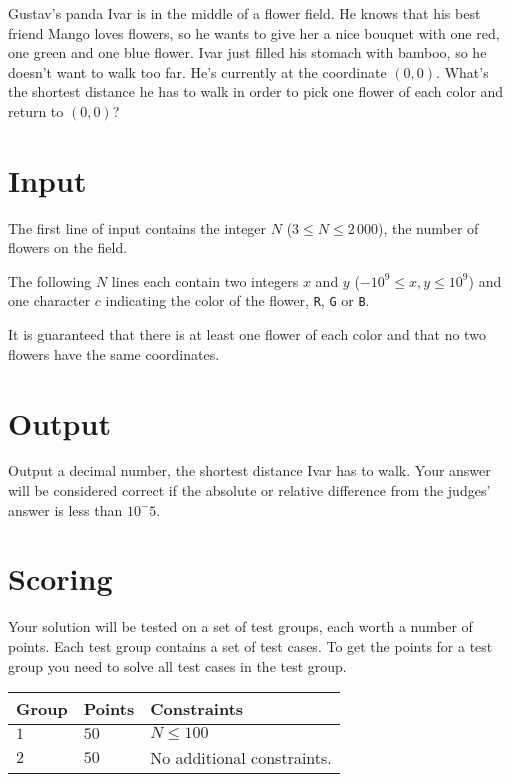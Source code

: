 \noindent

Gustav's panda Ivar is in the middle of a flower field.
He knows that his best friend Mango loves flowers, so he wants to give her a nice bouquet with one red, one green and one blue flower.
Ivar just filled his stomach with bamboo, so he doesn't want to walk too far.
He's currently at the coordinate $(0,0)$. What's the shortest distance he has to walk in order to pick one flower of each color and return to $(0,0)$?

\section*{Input}
The first line of input contains the integer $N$ ($3 \leq N \leq 2\,000$), the number of flowers on the field.

The following $N$ lines each contain two integers $x$ and $y$ ($-10^9 \leq x,y \leq 10^9$) and one character $c$ indicating the color
of the flower, \texttt{R}, \texttt{G} or \texttt{B}.

It is guaranteed that there is at least one flower of each color and that no two flowers have the same coordinates.

\section*{Output}
Output a decimal number, the shortest distance Ivar has to walk.
Your answer will be considered correct if the absolute or relative difference from the judges' answer is less than $10^-5$.

\section*{Scoring}
Your solution will be tested on a set of test groups, each worth a number of points. Each test group contains
a set of test cases. To get the points for a test group you need to solve all test cases in the test group.

\noindent
\begin{tabular}{| l | l | p{12cm} |}
  \hline
  \textbf{Group} & \textbf{Points} & \textbf{Constraints} \\ \hline
  $1$    & $50$       & $N \leq 100$ \\ \hline
  $2$    & $50$       & No additional constraints. \\ \hline
\end{tabular}
